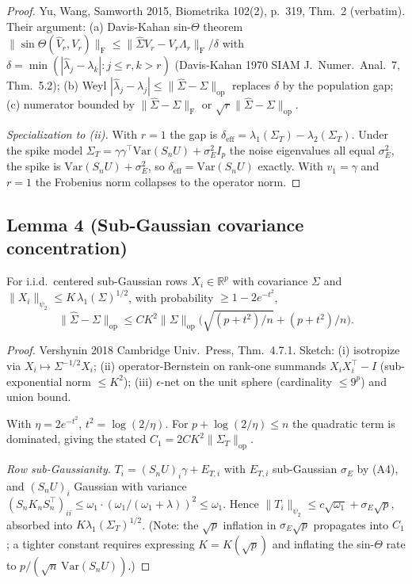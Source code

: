 \begin{proof}
Yu, Wang, Samworth 2015, Biometrika 102(2), p.~319, Thm.~2 (verbatim). Their
argument: (a) Davis-Kahan sin-$\Theta$ theorem
$\|\sin\Theta(\widehat V_r,V_r)\|_{\mathrm F}\le\|\widehat\Sigma V_r-V_r\Lambda_r\|_{\mathrm F}/\delta$
with $\delta=\min(|\widehat\lambda_j-\lambda_k|:j\le r,k>r)$ (Davis-Kahan 1970
SIAM J.\ Numer.\ Anal.~7, Thm.~5.2); (b) Weyl
$|\widehat\lambda_j-\lambda_j|\le\|\widehat\Sigma-\Sigma\|_{\mathrm{op}}$
replaces $\delta$ by the population gap; (c) numerator bounded by
$\|\widehat\Sigma-\Sigma\|_{\mathrm F}$ or $\sqrt r\|\widehat\Sigma-\Sigma\|_{\mathrm{op}}$.

\emph{Specialization to (ii).} With $r=1$ the gap is
$\delta_{\mathrm{eff}}=\lambda_1(\Sigma_T)-\lambda_2(\Sigma_T)$. Under the spike
model $\Sigma_T=\gamma\gamma^\top\mathrm{Var}(S_nU)+\sigma_E^2 I_p$ the noise
eigenvalues all equal $\sigma_E^2$, the spike is $\mathrm{Var}(S_nU)+\sigma_E^2$,
so $\delta_{\mathrm{eff}}=\mathrm{Var}(S_nU)$ exactly. With $v_1=\gamma$ and
$r=1$ the Frobenius norm collapses to the operator norm.
\end{proof}

\subsection*{Lemma 4 (Sub-Gaussian covariance concentration)}

\begin{lemma}\label{lem:vershynin}
For i.i.d.\ centered sub-Gaussian rows $X_i\in\mathbb{R}^p$ with covariance
$\Sigma$ and $\|X_i\|_{\psi_2}\le K\,\lambda_1(\Sigma)^{1/2}$, with probability
$\ge 1-2e^{-t^2}$,
\begin{equation}\label{eq:vershynin}
\|\widehat\Sigma-\Sigma\|_{\mathrm{op}}\le
C K^2\|\Sigma\|_{\mathrm{op}}\bigl(\sqrt{(p+t^2)/n}+(p+t^2)/n\bigr).
\end{equation}
\end{lemma}

\begin{proof}
Vershynin 2018 Cambridge Univ.\ Press, Thm.~4.7.1. Sketch: (i) isotropize via
$X_i\mapsto\Sigma^{-1/2}X_i$; (ii) operator-Bernstein on rank-one summands
$X_iX_i^\top-I$ (sub-exponential norm $\le K^2$); (iii) $\epsilon$-net on the
unit sphere (cardinality $\le 9^p$) and union bound.

With $\eta=2e^{-t^2}$, $t^2=\log(2/\eta)$. For $p+\log(2/\eta)\le n$ the
quadratic term is dominated, giving the stated $C_1=2CK^2\|\Sigma_T\|_{\mathrm{op}}$.

\emph{Row sub-Gaussianity.} $T_i=(S_nU)_i\gamma+E_{T,i}$ with $E_{T,i}$
sub-Gaussian $\sigma_E$ by (A4), and $(S_nU)_i$ Gaussian with variance
$(S_nK_nS_n^\top)_{ii}\le\omega_1\cdot(\omega_1/(\omega_1+\lambda))^2\le\omega_1$.
Hence $\|T_i\|_{\psi_2}\le c\sqrt{\omega_1}+\sigma_E\sqrt p$, absorbed into
$K\lambda_1(\Sigma_T)^{1/2}$. (Note: the $\sqrt p$ inflation in $\sigma_E\sqrt p$
propagates into $C_1$; a tighter constant requires expressing $K=K(\sqrt p)$
and inflating the sin-$\Theta$ rate to $p/(\sqrt n\,\mathrm{Var}(S_nU))$.)
\end{proof}

